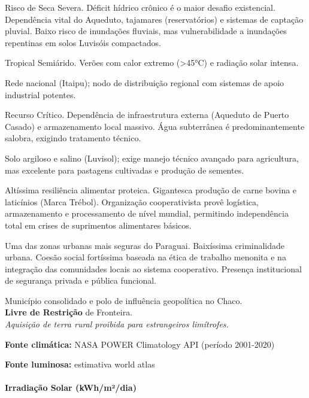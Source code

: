 \begin{description}[style=nextline,leftmargin=0.5cm,font=\bfseries]
\item[Hidrologia]  Risco de Seca Severa. Déficit hídrico crônico é o maior desafio existencial. Dependência vital do Aqueduto, tajamares (reservatórios) e sistemas de captação pluvial. Baixo risco de inundações fluviais, mas vulnerabilidade a inundações repentinas em solos Luvisóis compactados.
\item[Clima]  Tropical Semiárido. Verões com calor extremo (>45°C) e radiação solar intensa.
\item[Energia]  Rede nacional (Itaipu); nodo de distribuição regional com sistemas de apoio industrial potentes.
\item[Água]  Recurso Crítico. Dependência de infraestrutura externa (Aqueduto de Puerto Casado) e armazenamento local massivo. Água subterrânea é predominantemente salobra, exigindo tratamento técnico.
\item[Qualidade do Solo]  Solo argiloso e salino (Luvisol); exige manejo técnico avançado para agricultura, mas excelente para pastagens cultivadas e produção de sementes.
\item[Recursos Locais]  Altíssima resiliência alimentar proteica. Gigantesca produção de carne bovina e laticínios (Marca Trébol). Organização cooperativista provê logística, armazenamento e processamento de nível mundial, permitindo independência total em crises de suprimentos alimentares básicos.
\item[Segurança]  Uma das zonas urbanas mais seguras do Paraguai. Baixíssima criminalidade urbana. Coesão social fortíssima baseada na ética de trabalho menonita e na integração das comunidades locais ao sistema cooperativo. Presença institucional de segurança privada e pública funcional.
\item[Leis Local]  Município consolidado e polo de influência geopolítica no Chaco. \\ \textbf{Livre de Restrição} de Fronteira. \\ \textit{Aquisição de terra rural proibida para estrangeiros limítrofes.}
\end{description}
\textbf{Fonte climática:} NASA POWER Climatology API (período 2001-2020)

\textbf{Fonte luminosa:} estimativa world atlas

\paragraph{Irradiação Solar
(kWh/\allowbreak m²/\allowbreak dia)}

